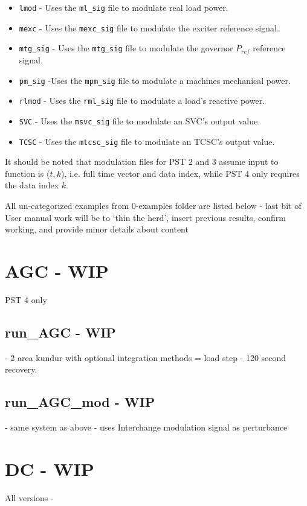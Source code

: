 \begin{itemize}
\item \verb|lmod| - Uses the \verb|ml_sig| file to modulate real load power.
\item \verb|mexc| - Uses the \verb|mexc_sig| file to modulate the exciter reference signal.
\item \verb|mtg_sig| - Uses the \verb|mtg_sig| file to modulate the governor $P_{ref}$ reference signal.
\item \verb|pm_sig| -Uses the \verb|mpm_sig| file to modulate a machines mechanical power.
\item \verb|rlmod| - Uses the \verb|rml_sig| file to modulate a load's reactive power.
\item \verb|SVC| - Uses the \verb|msvc_sig| file to modulate an SVC's output value.
\item \verb|TCSC| - Uses the \verb|mtcsc_sig| file to modulate an TCSC's output value.
\end{itemize}

\noindent It should be noted that modulation files for PST 2 and 3 assume input to function is ($t, k$), i.e. full time vector and data index, while PST 4 only requires the data index $k$.

\pagebreak
All un-categorized examples from 0-examples folder are listed below - last bit of User manual work will be to `thin the herd', insert previous results, confirm working, and provide minor details about content


\section{AGC - WIP}
PST 4 only

\subsection{run\_AGC - WIP}
- 2 area kundur with optional integration methods = load step - 120 second recovery.

\subsection{run\_AGC\_mod - WIP}
  - same system as above - uses Interchange modulation signal as perturbance


\section{DC - WIP}
All versions - 

